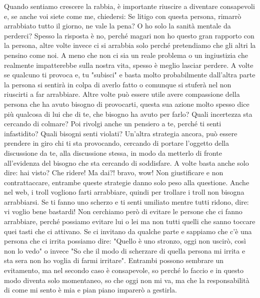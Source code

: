 \documentclass[12pt]{book} %
\begin{document}
Quando sentiamo crescere la rabbia, è importante riuscire a diventare consapevoli e, se anche voi siete come me, chiedersi:
Se litigo con questa persona, rimarrò arrabbiato tutto il giorno, ne vale la pena? O ho solo la sanità mentale da perderci?
Spesso la risposta è no, perché magari non ho questo gran rapporto con la persona, altre volte invece ci si arrabbia solo perché pretendiamo che gli altri la pensino come noi. A meno che non ci sia un reale problema o un ingiustizia che realmente impatterebbe sulla nostra vita, spesso è meglio lasciar perdere. 
A volte se qualcuno ti provoca e, tu "subisci" e basta molto probabilmente dall'altra parte la persona si sentirà in colpa di averlo fatto o comunque si stuferà nel non riuscirti a far arrabbiare. Altre volte può essere utile avere compassione della persona che ha avuto bisogno di provocarti, questa sua azione molto spesso dice più qualcosa di lui che di te, che bisogno ha avuto per farlo? Quali incertezza sta cercando di colmare? Poi rivolgi anche un pensiero a te, perché ti senti infastidito? Quali bisogni senti violati?
Un'altra strategia ancora, può essere prendere in giro chi ti sta provocando, cercando di portare l'oggetto della discussione da te, alla discussione stessa, in modo da metterlo di fronte all'evidenza del bisogno che sta cercando di soddisfare. A volte basta anche solo dire: \newline
hai visto? Che ridere! \newline
Ma dai?! bravo, wow! \newline
Non giustificare e non contrattaccare, entrambe queste strategie danno solo peso alla questione.
Anche nel web, i troll vogliono farti arrabbiare, quindi per trollare i troll non bisogna arrabbiarsi.
Se ti fanno uno scherzo e ti senti umiliato mentre tutti ridono, dire: vi voglio bene bastardi!
Non cerchiamo però di evitare le persone che ci fanno arrabbiare, perché possiamo evitare lui o lei ma non tutti quelli che sanno toccare quei tasti che ci attivano. Se ci invitano da qualche parte e sappiamo che c'è una persona che ci irrita possiamo dire: "Quello è uno stronzo, oggi non uscirò, così non lo vedo" o invece "So che il modo di scherzare di quella persona mi irrita e sta sera non ho voglia di farmi irritare". Entrambi possono sembrare un evitamento, ma nel secondo caso è consapevole, so perché lo faccio e in questo modo diventa solo momentaneo, so che oggi non mi va, ma che la responsabilità di come mi sento è mia e pian piano imparerò a gestirla.
\end{document}
